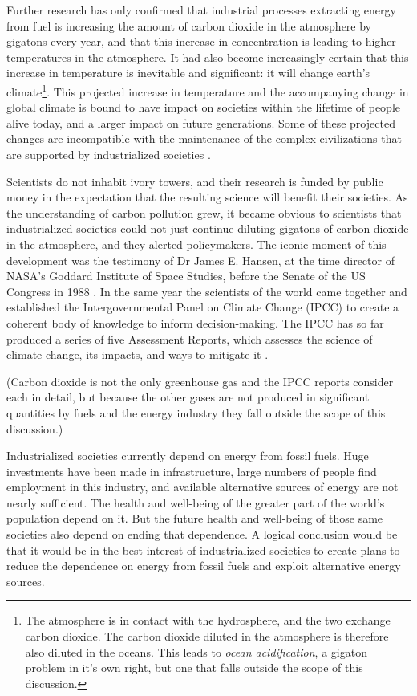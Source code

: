 Further research has only confirmed that industrial processes extracting energy
from fuel is increasing the amount of carbon dioxide in the atmosphere by
gigatons every year, and that this increase in concentration is leading to
higher temperatures in the atmosphere. It had also become increasingly certain
that this increase in temperature is inevitable and significant: it will change
earth's climate\footnote{The atmosphere is in contact with the hydrosphere, and
the two exchange carbon dioxide. The carbon dioxide diluted in the atmosphere is
therefore also diluted in the oceans. This leads to \textit{ocean
acidification}, a gigaton problem in it's own right, but one that falls outside
the scope of this discussion.}. This projected increase in temperature and the
accompanying change in global climate is bound to have impact on societies
within the lifetime of people alive today, and a larger impact on future
generations. Some of these projected changes are incompatible with the
maintenance of the complex civilizations that are supported by industrialized
societies \autocite{IPCC2014}.

Scientists do not inhabit ivory towers, and their research is funded by public
money in the expectation that the resulting science will benefit their
societies. As the understanding of carbon pollution grew, it became obvious to
scientists that industrialized societies could not just continue diluting
gigatons of carbon dioxide in the atmosphere, and they alerted policymakers. The
iconic moment of this development was the testimony of Dr James E. Hansen, at
the time director of NASA's Goddard Institute of Space Studies, before the
Senate of the US Congress in 1988 \autocite{Shabecoff1988}. In the same year the
scientists of the world came together and established the Intergovernmental
Panel on Climate Change (IPCC) to create a coherent body of knowledge to inform
decision-making. The IPCC has so far produced a series of five Assessment
Reports, which assesses the science of climate change, its impacts, and ways to
mitigate it \autocite{Allen2014}.

(Carbon dioxide is not the only greenhouse gas and the IPCC reports consider
each in detail, but because the other gases are not produced in significant
quantities by fuels and the energy industry they fall outside the scope of this
discussion.)

Industrialized societies currently depend on energy from fossil fuels. Huge
investments have been made in infrastructure, large numbers of people find
employment in this industry, and available alternative sources of energy are not
nearly sufficient. The health and well-being of the greater part of the world's
population depend on it. But the future health and well-being of those same
societies also depend on ending that dependence. A logical conclusion would be
that it would be in the best interest of industrialized societies to create
plans to reduce the dependence on energy from fossil fuels and exploit
alternative energy sources.

